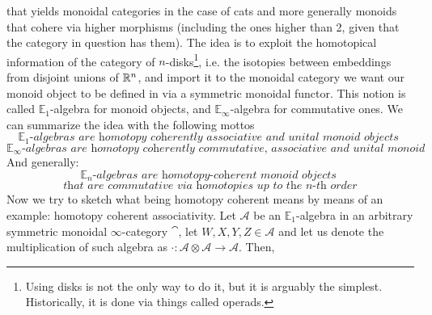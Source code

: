 that yields monoidal categories in the case of cats and more generally 
monoids that cohere via higher morphisms (including the ones higher than 2, given that the category in
question has them). The idea is to exploit the homotopical information of the category of $n$-disks\footnote{
    Using disks is not the only way to do it, but it is arguably the simplest. Historically, it is done via things called
    operads.}, i.e. the isotopies between embeddings from disjoint unions of $\mathbb{R}^n$, and import it to the monoidal
category we want our monoid object to be defined in via a symmetric monoidal functor. This notion is called 
$\mathbb{E}_1$-algebra for monoid objects, and $\mathbb{E}_\infty$-algebra for commutative ones.
We can summarize the idea with the following mottos 
$$\mathbb{E}_1\textit{-algebras are homotopy coherently associative and unital monoid objects }$$
$$\mathbb{E}_\infty\textit{-algebras are homotopy coherently commutative, associative and unital monoid objects}$$
And generally:
$$ \mathbb{E}_n\textit{-algebras are homotopy-coherent monoid objects } $$
$$  \textit{that are commutative via homotopies up to the $n$-th order}$$
Now we try to sketch what being homotopy coherent means by means of an example:
homotopy coherent associativity.
Let $\mathcal{A}$ be an $\mathbb{E}_1$-algebra in an arbitrary symmetric monoidal $\infty$-category
$\cat$, let $W,X,Y,Z\in \mathcal{A}$ and let us denote the multiplication of such algebra 
as $\cdot:\mathcal{A}\otimes\mathcal{A}\to\mathcal{A}$. Then, 
